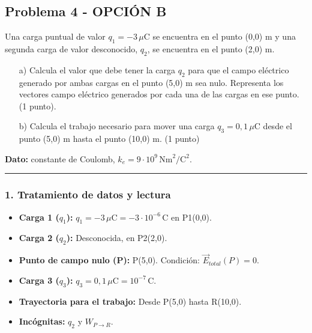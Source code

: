 \newpage

\subsection{Problema 4 - OPCIÓN B}
\label{subsec:4B_2015_jul_ext}

\begin{cajaenunciado}
Una carga puntual de valor $q_{1}=-3\,\mu\text{C}$ se encuentra en el punto (0,0) m y una segunda carga de valor desconocido, $q_{2}$, se encuentra en el punto (2,0) m.
\begin{enumerate}
    \item[a)] Calcula el valor que debe tener la carga $q_{2}$ para que el campo eléctrico generado por ambas cargas en el punto (5,0) m sea nulo. Representa los vectores campo eléctrico generados por cada una de las cargas en ese punto. (1 punto).
    \item[b)] Calcula el trabajo necesario para mover una carga $q_{3}=0,1\,\mu\text{C}$ desde el punto (5,0) m hasta el punto (10,0) m. (1 punto)
\end{enumerate}
\textbf{Dato:} constante de Coulomb, $k_{e}=9\cdot10^{9}\,\text{Nm}^{2}/\text{C}^{2}$.
\end{cajaenunciado}
\hrule

\subsubsection*{1. Tratamiento de datos y lectura}
\begin{itemize}
    \item \textbf{Carga 1 ($q_1$):} $q_1 = -3\,\mu\text{C} = -3\cdot10^{-6}\,\text{C}$ en P1(0,0).
    \item \textbf{Carga 2 ($q_2$):} Desconocida, en P2(2,0).
    \item \textbf{Punto de campo nulo (P):} P(5,0). Condición: $\vec{E}_{total}(P)=0$.
    \item \textbf{Carga 3 ($q_3$):} $q_3 = 0,1\,\mu\text{C} = 10^{-7}\,\text{C}$.
    \item \textbf{Trayectoria para el trabajo:} Desde P(5,0) hasta R(10,0).
    \item \textbf{Incógnitas:} $q_2$ y $W_{P \to R}$.
\end{itemize}

